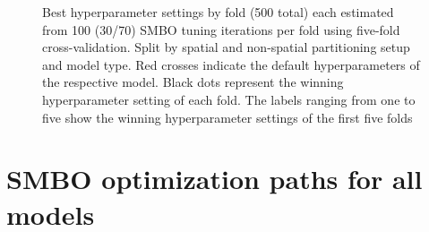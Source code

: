 \documentclass[review]{elsarticle}
\begin{document}
\begin{figure} [ht]
	\begin{center}
		\caption[]{Best hyperparameter settings by fold (500 total) each estimated from 100 (30/70) SMBO tuning iterations per fold using five-fold cross-validation. Split by spatial and non-spatial partitioning setup and model type.
			Red crosses indicate the default hyperparameters of the respective model.
			Black dots represent the winning hyperparameter setting of each fold.
			The labels ranging from one to five show the winning hyperparameter settings of the first five folds}
		\label{fig:best_parameter_combs_app}
	\end{center}
\end{figure}

\pagebreak

\section{SMBO optimization paths for all models}
\end{document}

